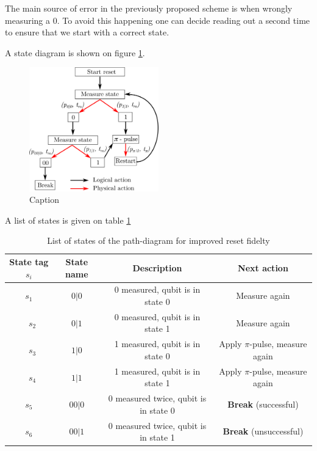 The main source of error in the previously proposed scheme is when wrongly measuring a 0. To avoid this happening one can decide reading out a second time to ensure that we start with a correct state.

A state diagram is shown on figure \ref{fig:double_infinite_branching}. 

\begin{figure}[h]
    \centering
    \includegraphics[width=0.5\textwidth]{pic/algorithmic_reset/double_infinite_branching.png}
    \caption{Caption}
    \label{fig:double_infinite_branching}
\end{figure}

A list of states is given on table \ref{tab:states_branching2}

 
 \begin{table}[h]
     \centering
     \begin{tabular}{c|c|c|c}
        State tag $s_i$ & State name & Description & Next action \\ \hline 
        $s_1$ & $0|0$  & 0 measured, qubit is in state 0 & Measure again \\ 
        $s_2$ & $0|1$  & 0 measured, qubit is in state 1 & Measure again \\ 
        $s_3$ & $1|0$  & 1 measured, qubit is in state 0 & Apply $\pi$-pulse, measure again \\ 
        $s_4$ & $1|1$  & 1 measured, qubit is in state 1 & Apply $\pi$-pulse, measure again \\
        $s_5$ & $00|0$  & 0 measured twice, qubit is in state 0 & \textbf{Break} (successful) \\
        $s_6$ & $00|1$  & 0 measured twice, qubit is in state 1 & \textbf{Break} (unsuccessful) \\
        
     \end{tabular}
     \caption{List of states of the path-diagram for improved reset fidelty}
     \label{tab:states_branching2}
 \end{table}


